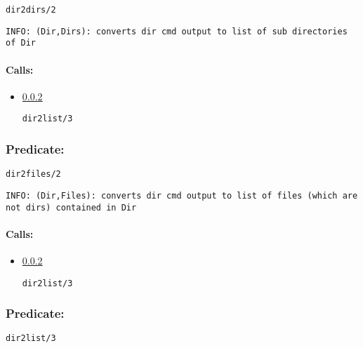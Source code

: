 \begin{verbatim}
dir2dirs/2
\end{verbatim}

{\small \begin{verbatim}
INFO: (Dir,Dirs): converts dir cmd output to list of sub directories of Dir

\end{verbatim}}
\paragraph{Calls:} 
\begin{itemize}
\item \ref{dir2listV95W3} 
\begin{verbatim}
dir2list/3
\end{verbatim}

\end{itemize}

\subsubsection{Predicate:} \label{dir2filesV95W2}

\begin{verbatim}
dir2files/2
\end{verbatim}

{\small \begin{verbatim}
INFO: (Dir,Files): converts dir cmd output to list of files (which are not dirs) contained in Dir

\end{verbatim}}
\paragraph{Calls:} 
\begin{itemize}
\item \ref{dir2listV95W3} 
\begin{verbatim}
dir2list/3
\end{verbatim}

\end{itemize}

\subsubsection{Predicate:} \label{dir2listV95W3}

\begin{verbatim}
dir2list/3
\end{verbatim}

